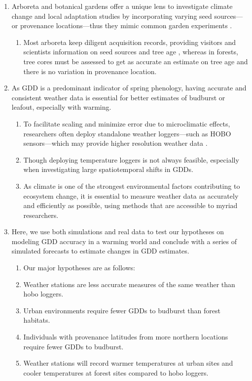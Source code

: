 \documentclass{article}\usepackage[]{graphicx}\usepackage[]{color}
\begin{document}
\begin{enumerate}
\item Arboreta and botanical gardens offer a unique lens to investigate climate change and local adaptation studies by incorporating varying seed sources---or provenance locations---thus they mimic common garden experiments \citep{Primack2009}. 
  \begin{enumerate}
  \item Most arboreta keep diligent acquisition records, providing visitors and scientists information on seed sources and tree age \citep{Dosmann2006}, whereas in forests, tree cores must be assessed to get as accurate an estimate on tree age and there is no variation in provenance location.
  \end{enumerate}
  
\item As GDD is a predominant indicator of spring phenology, having accurate and consistent weather data is essential for better estimates of budburst or leafout, especially with warming.
  \begin{enumerate}
  \item To facilitate scaling and minimize error due to microclimatic effects, researchers often deploy standalone weather loggers---such as HOBO sensors---which may provide higher resolution weather data \citep{Schwartz2013a,Whiteman2000}.
  \item Though deploying temperature loggers is not always feasible, especially when investigating large spatiotemporal shifts in GDDs. 
  \item As climate is one of the strongest environmental factors contributing to ecosystem change, it is essential to measure weather data as accurately and efficiently as possible, using methods that are accessible to myriad researchers.
  \end{enumerate}
  
\item Here, we use both simulations and real data to test our hypotheses on modeling GDD accuracy in a warming world and conclude with a series of simulated forecasts to estimate changes in GDD estimates.
  \begin{enumerate}
  \item Our major hypotheses are as follows:
  \item Weather stations are less accurate measures of the same weather than hobo loggers.
  \item Urban environments require fewer GDDs to budburst than forest habitats.
  \item Individuals with provenance latitudes from more northern locations require fewer GDDs to budburst. 
  \item Weather stations will record warmer temperatures at urban sites and cooler temperatures at forest sites compared to hobo loggers. 
  \end{enumerate}
\end{enumerate}
  
\end{document}
